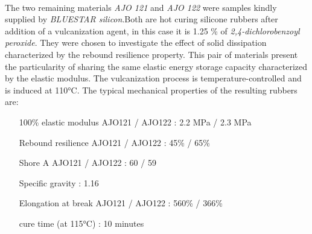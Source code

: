 \paragraph{}
The two remaining materials \emph{AJO 121} and \emph{AJO 122} were samples kindly supplied by \emph{BLUESTAR silicon}.Both are hot curing silicone rubbers after addition of a vulcanization agent, in this case it is 1.25 \% of \emph{2,4-dichlorobenzoyl peroxide}. They were chosen to investigate the effect of solid dissipation characterized by the rebound resilience property. This pair of materials present the particularity of sharing the same elastic energy storage capacity characterized by the elastic modulus. The vulcanization process is temperature-controlled and is induced at 110°C.
The typical mechanical properties of the resulting rubbers are:
\begin{itemize}
	\item[100\% elastic modulus AJO121 / AJO122]: 2.2 MPa / 2.3 MPa
	\item[Rebound resilience AJO121 / AJO122]: 45\% / 65\%
	\item[Shore A AJO121 / AJO122]: 60 / 59 
	\item[Specific gravity]: 1.16
	\item[Elongation at break AJO121 / AJO122]: 560\% / 366\%
	\item[cure time (at 115°C)]: 10 minutes
\end{itemize}


 


\subsubsection{}
